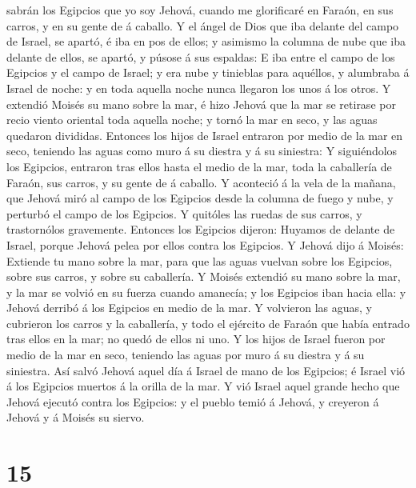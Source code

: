 sabrán los Egipcios que yo soy Jehová, cuando me glorificaré en Faraón,
en sus carros, y en su gente de á caballo.  Y el ángel de
Dios que iba delante del campo de Israel, se apartó, é iba en pos de
ellos; y asimismo la columna de nube que iba delante de ellos, se
apartó, y púsose á sus espaldas:  E iba entre el campo de
los Egipcios y el campo de Israel; y era nube y tinieblas para aquéllos,
y alumbraba á Israel de noche: y en toda aquella noche nunca llegaron
los unos á los otros.  Y extendió Moisés su mano sobre la
mar, é hizo Jehová que la mar se retirase por recio viento oriental toda
aquella noche; y tornó la mar en seco, y las aguas quedaron divididas.
 Entonces los hijos de Israel entraron por medio de la
mar en seco, teniendo las aguas como muro á su diestra y á su siniestra:
 Y siguiéndolos los Egipcios, entraron tras ellos hasta
el medio de la mar, toda la caballería de Faraón, sus carros, y su gente
de á caballo.  Y aconteció á la vela de la mañana, que
Jehová miró al campo de los Egipcios desde la columna de fuego y nube, y
perturbó el campo de los Egipcios.  Y quitóles las ruedas
de sus carros, y trastornólos gravemente. Entonces los Egipcios dijeron:
Huyamos de delante de Israel, porque Jehová pelea por ellos contra los
Egipcios.  Y Jehová dijo á Moisés: Extiende tu mano sobre
la mar, para que las aguas vuelvan sobre los Egipcios, sobre sus carros,
y sobre su caballería.  Y Moisés extendió su mano sobre
la mar, y la mar se volvió en su fuerza cuando amanecía; y los Egipcios
iban hacia ella: y Jehová derribó á los Egipcios en medio de la mar.
 Y volvieron las aguas, y cubrieron los carros y la
caballería, y todo el ejército de Faraón que había entrado tras ellos en
la mar; no quedó de ellos ni uno.  Y los hijos de Israel
fueron por medio de la mar en seco, teniendo las aguas por muro á su
diestra y á su siniestra.  Así salvó Jehová aquel día á
Israel de mano de los Egipcios; é Israel vió á los Egipcios muertos á la
orilla de la mar.  Y vió Israel aquel grande hecho que
Jehová ejecutó contra los Egipcios: y el pueblo temió á Jehová, y
creyeron á Jehová y á Moisés su siervo.

\hypertarget{section-14}{%
\section{15}\label{section-14}}

